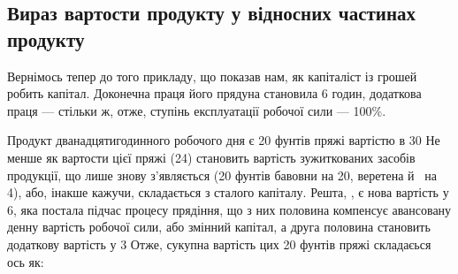 \subsection{Вираз вартости продукту у відносних частинах продукту}

Вернімось тепер до того прикладу, що показав нам, як капіталіст із грошей робить капітал. Доконечна
праця його прядуна
становила 6 годин, додаткова праця — стільки ж, отже, ступінь експлуатації робочої сили — 100\%.

Продукт дванадцятигодинного робочого дня є 20 фунтів пряжі вартістю в 30 Не менше як 
вартости цієї пряжі (24) становить вартість зужиткованих засобів продукції, що лише знову
з’являється (20 фунтів бавовни на 20, веретена й~ на 4), або, інакше кажучи,
складається з сталого капіталу. Решта, , є нова вартість у 6, яка постала підчас
процесу прядіння, що з них половина компенсує авансовану денну вартість робочої сили, або змінний
капітал, а друга половина становить додаткову вартість у 3 Отже, сукупна вартість цих 20
фунтів пряжі складаєься ось як:
